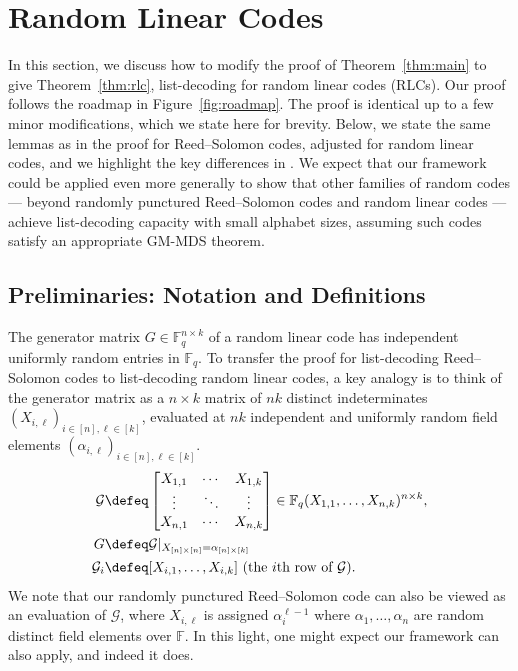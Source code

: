 \documentclass{article}[11pt]
\begin{document}
\section{Random Linear Codes}
\label{sec:rlc}

In this section, we discuss how to modify the proof of Theorem~\ref{thm:main} to give Theorem~\ref{thm:rlc}, list-decoding for random linear codes (RLCs).
Our proof follows the roadmap in Figure~\ref{fig:roadmap}.
The proof is identical up to a few minor modifications, which we state here for brevity.
Below, we state the same lemmas as in the proof for Reed--Solomon codes, adjusted for random linear codes, and we highlight the key differences in .
We expect that our framework could be applied even more generally to show that other families of random codes --- beyond randomly punctured Reed--Solomon codes and random linear codes --- achieve list-decoding capacity with small alphabet sizes, assuming such codes satisfy an appropriate GM-MDS theorem.

\subsection{Preliminaries: Notation and Definitions}
The generator matrix $G\in \mathbb{F}_q^{n\times  k}$ of a random linear code has independent uniformly random entries in $\mathbb{F}_q$.
To transfer the proof for list-decoding Reed--Solomon codes to list-decoding random linear codes, a key analogy is to think of the generator matrix as a $n\times k$ matrix of $nk$ distinct indeterminates $(X_{i,\ell})_{i\in[n],\ell\in[k]}$, evaluated at $nk$ independent and uniformly random field elements $(\alpha_{i,\ell})_{i\in[n],\ell\in[k]}$.
\begin{align}
  \mathcal{G} &\defeq 
  \begin{bmatrix}
    X_{1,1} & \cdots & X_{1,k} \\
    \vdots & \ddots & \vdots\\
    X_{n,1} & \cdots & X_{n,k} \\
  \end{bmatrix} \in \mathbb{F}_q(X_{1,1},\dots,X_{n,k})^{n\times k}, \nonumber\\
  G &\defeq \mathcal{G} 
  \vert_{X_{[n]\times [n]}=\alpha_{[n]\times [k]}} \nonumber\\
  \mathcal{G}_i &\defeq [X_{i,1},\dots,X_{i,k}] \text{ (the $i$th row of $\mathcal{G}$).}
  \label{}
\end{align}
We note that our randomly punctured Reed--Solomon code can also be viewed as an evaluation of $\mathcal{G}$, where $X_{i,\ell}$ is assigned $\alpha_i^{\ell-1}$ where $\alpha_1,\dots,\alpha_n$ are random distinct field elements over $\mathbb{F}$.
In this light, one might expect our framework can also apply, and indeed it does.
\end{document}

